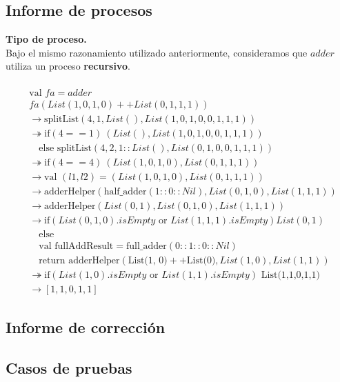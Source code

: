 \documentclass[12pt, a4paper]{article}
\begin{document}
\subsection{Informe de procesos}
\textbf{Tipo de proceso.} \\ 
Bajo el mismo razonamiento utilizado anteriormente, consideramos que $adder$ utiliza un proceso \textbf{recursivo}. \\ \\
\newpage
\begin{align*}
  &\text{val } fa = adder \\
  &fa(List(1,0,1,0) ++ List(0,1,1,1)) \\
  &\rightarrow \text{splitList}(4, 1, List(), List(1,0,1,0,0,1,1,1)) \\
  &\twoheadrightarrow \text{if}(4 == 1) ~(List(), List(1,0,1,0,0,1,1,1)) \\
  &\quad \text{else splitList}(4, 2, 1::List(), List(0,1,0,0,1,1,1)) \\
  &\twoheadrightarrow \text{if}(4 == 4) ~(List(1,0,1,0), List(0,1,1,1)) \\
  &\rightarrow \text{val }(l1, l2) = (List(1,0,1,0), List(0,1,1,1)) \\
  &\rightarrow \text{adderHelper}( \text{half\_adder}(1::0::Nil), List(0,1,0), List(1,1,1) ) \\
  &\rightarrow \text{adderHelper}( List(0,1), List(0,1,0), List(1,1,1) ) \\
  &\rightarrow \text{if}( List(0,1,0).isEmpty \text{ or } List(1,1,1).isEmpty ) List(0,1) \\
  &\quad \text{else } \\
  &\quad \text{val fullAddResult} = \text{full\_adder}(0::1::0::Nil) \\
  &\quad \text{return adderHelper}( \text{List(1, 0)} ++ \text{List(0)}, List(1,0), List(1,1) ) \\
  &\twoheadrightarrow \text{if}(List(1,0).isEmpty \text{ or } List(1,1).isEmpty) \text{ List(1,1,0,1,1)} \\
  &\rightarrow [1,1,0,1,1]
  \end{align*}




\subsection{Informe de corrección}

\subsection{Casos de pruebas}
\end{document}
